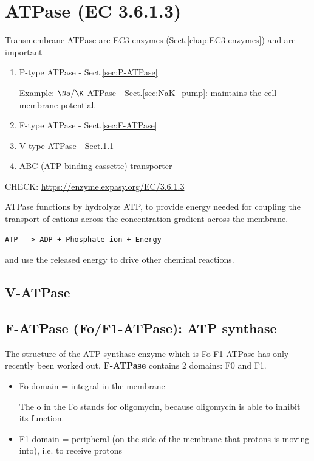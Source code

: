 \section{ATPase (EC 3.6.1.3)}
\label{sec:ATPase}

Transmembrane ATPase are EC3 enzymes (Sect.\ref{chap:EC3-enzymes}) and are
important
\begin{enumerate}
  
  \item P-type ATPase - Sect.\ref{sec:P-ATPase}

Example: $\Na/\K$-ATPase - Sect.\ref{sec:NaK_pump}: maintains the cell
membrane potential.

  \item F-type ATPase - Sect.\ref{sec:F-ATPase}
  
  \item V-type ATPase - Sect.\ref{sec:V-ATpase}
  
  \item ABC (ATP binding cassette) transporter 
\end{enumerate}
CHECK: \url{https://enzyme.expasy.org/EC/3.6.1.3}

ATPase functions by hydrolyze ATP, to provide energy needed for coupling the
transport of cations across the concentration gradient across the membrane.
\begin{verbatim}
ATP --> ADP + Phosphate-ion + Energy
\end{verbatim}
and use the released energy to drive other chemical reactions.

\subsection{V-ATPase}
\label{sec:V-ATpase}


\subsection{F-ATPase (Fo/F1-ATPase): ATP synthase}
\label{sec:Fo/F1-ATPase}
\label{sec:F-ATPase}
\label{sec:ATP-synthase}


The structure of the ATP synthase enzyme which is Fo-F1-ATPase
has only recently been worked out.  {\bf F-ATPase} contains 2 domains: F0 and
F1.
\begin{itemize}
  \item Fo domain = integral in the membrane

The o in the Fo stands for oligomycin, because oligomycin is able to inhibit its
function.

  \item F1 domain = peripheral (on the side of the membrane that protons is
  moving into), i.e. to receive protons
\end{itemize}

